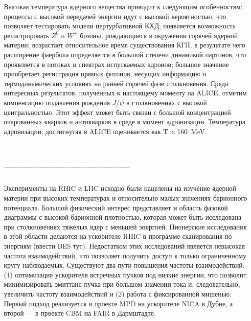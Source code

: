 Высокая температура ядерного вещества приводит к следующим особенностям: процессы с высокой передачей энергии идут с высокой вероятностью, что позволяет тестировать модели пертурбативной КХД; появляется возможность регистрировать $Z^{0}$ и $W^{\pm}$ бозоны, рождающиеся в окружении горячей ядерной материи; возрастает относительное время существования КГП, в результате чего расширение фаербола определяется в большой степени динамикой партонов, что проявляется в потоках и спектрах испускаемых адронов; большое значение приобретает регистрация прямых фотонов, несущих информацию о термодинамических условиях на ранней горячей фазе столкновения. Среди интересных результатов, полученных к настоящему моменту на ALICE, отметим компенсацию подавления рождения $J/\psi$ в столкновениях с высокой центральностью. Этот эффект может быть связан с большой концентрацией очарованных кварков и антикварков в среде в момент адронизации. Температура адронизации, достигнутая в ALICE оценивается как T$\approx$160~MeV.

%


\section{------------------------}

Эксперименты на RHIC и LHC исходно были нацелены на изучение ядерной материи при высоких температурах и относительно малых значениях барионного потенциала. Большой физический интерес представляет и область фазовой диаграммы с высокой барионной плотностью, которая может быть исследована при столкновениях тяжелых ядер с меньшей энергией. Пионерские исследования в этой области делаются на ускорителе RHIC в программе сканирования по энергиям (\todo ввести BES тут). Недостатком этих исследований является невысокая частота взаимодействий, что позволяет получить доступ к только ограниченному кругу наблюдаемых. Существуют два пути повышения частоты взаимодействий: (1) оптимизация ускорителя встречных пучков под низкие энергии, что позволит минимизировать эмиттанс пучка при большом значении тока и, следовательно, увеличить частоту взаимодействий и (2) работа с фиксированной мишенью. Первый подход реализуется в проекте MPD на ускорителе NICA в Дубне, а второй --- в проекте CBM на FAIR в Дармштадте.

